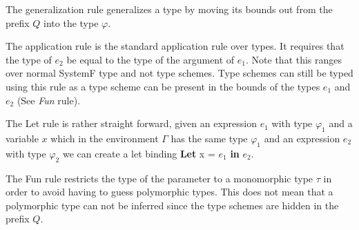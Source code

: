 \documentclass[twoside, titlepage, openright, a4paper]{book}
\begin{document}
The generalization rule generalizes a type by moving its bounds out from the prefix $Q$ into the type $\varphi$.

\begin{prooftree}
\end{prooftree}

The application rule is the standard application rule over types. It requires that the type of $e_2$ be equal to the type of the argument of $e_1$. Note that this ranges over normal SystemF type and not type schemes. Type schemes can still be typed using this rule as a type scheme can be present in the bounds of the types $e_1$ and $e_2$ (See \emph{Fun} rule).

\begin{prooftree}
\end{prooftree}

The Let rule is rather straight forward, given an expression $e_1$ with type $\varphi_1$ and a variable $x$ which in the environment $\Gamma$ has the same type $\varphi_1$ and an expression $e_2$ with type $\varphi_2$ we can create a let binding \textbf{Let} x = $e_1$ \textbf{in} $e_2$.

\begin{prooftree}
\end{prooftree}

The Fun rule restricts the type of the parameter to a monomorphic type $\tau$ in order to avoid having to guess polymorphic types. This does not mean that a polymorphic type can not be inferred since the type schemes are hidden in the prefix $Q$.

\begin{prooftree}
\end{prooftree}
\end{document}
